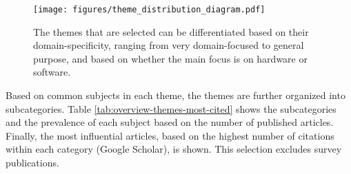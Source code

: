 \begin{figure}[!htbp]
    \centering
    \texttt{[image: figures/theme\_distribution\_diagram.pdf]}
    \caption{The themes that are selected can be differentiated based on their domain-specificity, ranging from very domain-focused to general purpose, and based on whether the main focus is on hardware or software. }
    \label{fig:theme-distribution}
\end{figure}
Based on common subjects in each theme, the themes are further organized into %
subcategories. Table \ref{tab:overview-themes-most-cited} shows the subcategories and %
the prevalence of each  subject based on the number of published articles. %
Finally, the most influential articles, based on the highest number of citations within each category (Google Scholar), is shown. This selection excludes survey publications.

